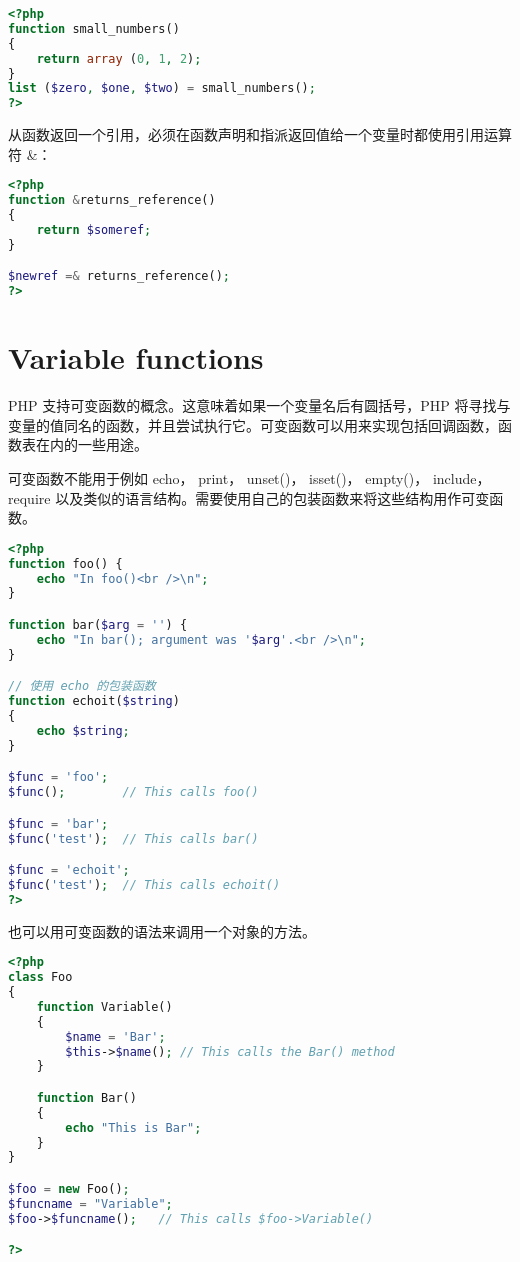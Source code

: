 \begin{lstlisting}[language=PHP]
<?php
function small_numbers()
{
    return array (0, 1, 2);
}
list ($zero, $one, $two) = small_numbers();
?>
\end{lstlisting}

从函数返回一个引用，必须在函数声明和指派返回值给一个变量时都使用引用运算符 \&：

\begin{lstlisting}[language=PHP]
<?php
function &returns_reference()
{
    return $someref;
}

$newref =& returns_reference();
?>
\end{lstlisting}


\chapter{Variable functions}


PHP 支持可变函数的概念。这意味着如果一个变量名后有圆括号，PHP 将寻找与变量的值同名的函数，并且尝试执行它。可变函数可以用来实现包括回调函数，函数表在内的一些用途。


可变函数不能用于例如 echo， print， unset()， isset()， empty()， include， require 以及类似的语言结构。需要使用自己的包装函数来将这些结构用作可变函数。

\begin{lstlisting}[language=PHP]
<?php
function foo() {
    echo "In foo()<br />\n";
}

function bar($arg = '') {
    echo "In bar(); argument was '$arg'.<br />\n";
}

// 使用 echo 的包装函数
function echoit($string)
{
    echo $string;
}

$func = 'foo';
$func();        // This calls foo()

$func = 'bar';
$func('test');  // This calls bar()

$func = 'echoit';
$func('test');  // This calls echoit()
?>
\end{lstlisting}


也可以用可变函数的语法来调用一个对象的方法。

\begin{lstlisting}[language=PHP]
<?php
class Foo
{
    function Variable()
    {
        $name = 'Bar';
        $this->$name(); // This calls the Bar() method
    }

    function Bar()
    {
        echo "This is Bar";
    }
}

$foo = new Foo();
$funcname = "Variable";
$foo->$funcname();   // This calls $foo->Variable()

?>
\end{lstlisting}

